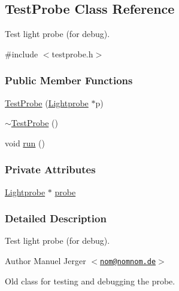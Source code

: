 \hypertarget{classTestProbe}{\subsection{\-Test\-Probe \-Class \-Reference}
\label{classTestProbe}
}


\-Test light probe (for debug).  




{\ttfamily \#include $<$testprobe.\-h$>$}

\subsubsection*{\-Public \-Member \-Functions}
\begin{DoxyCompactItemize}
\item 
\hyperlink{classTestProbe_a0f2175166ce5000e84ff0dd925991011}{\-Test\-Probe} (\hyperlink{classLightprobe}{\-Lightprobe} $\ast$p)
\item 
\hyperlink{classTestProbe_acad872ca45d0619cb8f9f549b35b5131}{$\sim$\-Test\-Probe} ()
\item 
void \hyperlink{classTestProbe_a7a63f8258dc040bc4e5e3fa5ffcf9ece}{run} ()
\end{DoxyCompactItemize}
\subsubsection*{\-Private \-Attributes}
\begin{DoxyCompactItemize}
\item 
\hyperlink{classLightprobe}{\-Lightprobe} $\ast$ \hyperlink{classTestProbe_a49d9564b18f0b0469ae7ec3a6600b695}{probe}
\end{DoxyCompactItemize}


\subsubsection{\-Detailed \-Description}
\-Test light probe (for debug). 

\begin{DoxyAuthor}{\-Author}
\-Manuel \-Jerger $<$\href{mailto:nom@nomnom.de}{\tt nom@nomnom.\-de}$>$
\end{DoxyAuthor}
\-Old class for testing and debugging the probe. 


